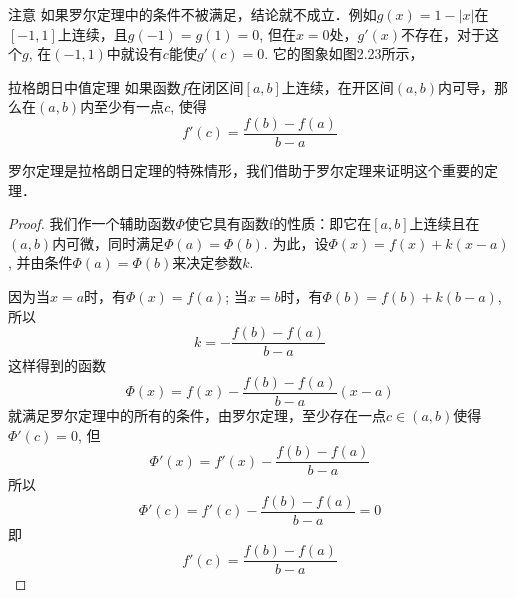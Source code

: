 \begin{figure}[htp]
    \centering
    \begin{minipage}[t]{0.48\textwidth}
    \centering
{}
    \caption{}
    \end{minipage}
    \begin{minipage}[t]{0.48\textwidth}
    \centering
    \caption{}
    \end{minipage}
    \end{figure}


\begin{rmk}
    注意 如果罗尔定理中的条件不被满足，结论就不成立．例如$g(x)=1-|x|$在$[-1, 1]$上连续，且$g(-1)=g(1)=0$, 但在$x=0$处，$g'(x)$不存在，对于这个$g$, 在$(-1,1)$中就设有$c$能使$g'(c)=0$. 它的图象如图2.23所示，
\end{rmk}

\begin{blk}
    {拉格朗日中值定理} 如果函数$f$在闭区间$[a,b]$上连续，在开区间$(a,b)$内可导，那么在$(a,b)$内至少有一点$c$, 使得
\[f'(c)=\frac{f(b)-f(a)}{b-a}\]
\end{blk}

罗尔定理是拉格朗日定理的特殊情形，我们借助于罗尔定理来证明这个重要的定理．

\begin{proof}
 我们作一个辅助函数$\Phi$使它具有函数f的性质：即它在$[a,b]$上连续且在$(a,b)$内可微，同时满足$\Phi (a)=\Phi (b)$. 为此，设$\Phi  (x) =f (x) +k (x-a)$, 并由条件$\Phi (a)=\Phi (b)$来决定参数$k$. 

因为当$x=a$时，有$\Phi (x)=f(a)$; 当$x=b$时，有$\Phi (b)=f(b)+k(b-a)$, 所以
\[k=-\frac{f (b) -f (a)}{b-a}\]
这样得到的函数
\[\Phi  (x) =f (x) -\frac{f (b) -f (a) }{b-a}(x-a)\]
就满足罗尔定理中的所有的条件，由罗尔定理，至少存在一点$c\in (a,b)$使得$\Phi '(c)=0$,
但
\[\Phi ' (x) =f' (x) -\frac{f (b) -f (a)}{b-a}\]
所以
\[\Phi ' (c) =f' (c) -\frac{f (b) -f (a)}{b-a} =0\]
即
\[f' (c) =\frac{f (b) -f (a)}{b-a}\]
\end{proof}

